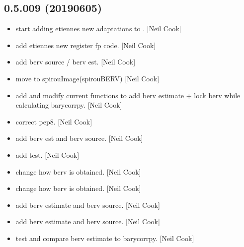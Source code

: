 \documentclass[a4paper,10pt,english]{report}
\begin{document}
\subsection{0.5.009 (2019\sphinxhyphen{}06\sphinxhyphen{}05)}
\label{\detokenize{misc/changelog:id147}}\begin{itemize}
\item {} 
 \sphinxhyphen{} start adding etiennes new adaptations to
. {[}Neil Cook{]}

\item {} 
 \sphinxhyphen{} add etiennes new register fp code. {[}Neil Cook{]}

\item {} 
 \sphinxhyphen{} add berv source / berv est. {[}Neil Cook{]}

\item {} 
 \sphinxhyphen{} move  to spirouImage(spirouBERV)
{[}Neil Cook{]}

\item {} 
 \sphinxhyphen{} add  and modify current functions to add
berv estimate + lock berv while calculating barycorrpy. {[}Neil Cook{]}

\item {} 
 \sphinxhyphen{} correct pep8. {[}Neil Cook{]}

\item {} 
 \sphinxhyphen{} add berv est and berv source. {[}Neil Cook{]}

\item {} 
 \sphinxhyphen{} add  test. {[}Neil Cook{]}

\item {} 
 \sphinxhyphen{} change how berv is obtained. {[}Neil Cook{]}

\item {} 
 \sphinxhyphen{} change how berv is obtained. {[}Neil Cook{]}

\item {} 
 \sphinxhyphen{} add berv estimate and berv source. {[}Neil
Cook{]}

\item {} 
 \sphinxhyphen{} add berv estimate and berv source. {[}Neil
Cook{]}

\item {} 
 \sphinxhyphen{} test and compare berv estimate to
barycorrpy. {[}Neil Cook{]}

\end{itemize}
\end{document}
